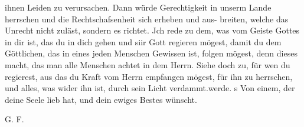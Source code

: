 {    ihnen Leiden zu verursachen. Dann würde Gerechtigkeit in unserm
    Lande herrschen und die Rechtschafsenheit sich erheben und aus-
    breiten, welche das Unrecht nicht zuläst, sondern es richtet. Jch
    rede zu dem, was vom Geiste Gottes in dir ist, das du in dich
    gehen und siir Gott regieren mögest, damit du dem Göttlichen,
    das in eines jeden Menschen Gewissen ist, folgen mögest, denn
    dieses macht, das man alle Menschen achtet in dem Herrn. Siehe
    doch zu, für wen du regierest, aus das du Kraft vom Herrn
    empfangen mögest, für ihn zu herrschen, und alles, was wider ihn
    ist, durch sein Licht verdammt.werde.
    s Von einem, der deine Seele lieb hat, und dein ewiges Bestes
    wünscht.

    \bigskip

    \begin{flushright}G. F.\end{flushright}

}
